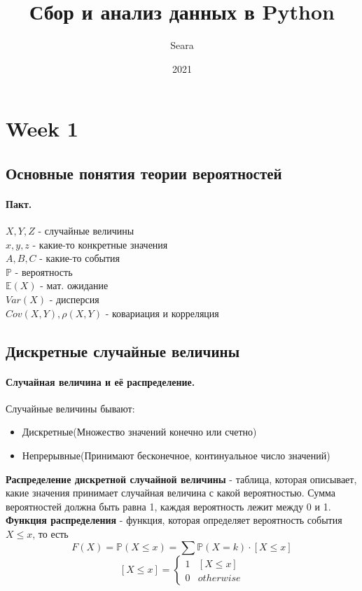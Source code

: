 \documentclass{article}
\title{Сбор и анализ данных в Python}
\date{2021}
\author{Seara}
\newcommand{\E}{\mathbb{E}}
\begin{document}
\maketitle
\newpage
{}

\section{Week 1}
\subsection{Основные понятия теории вероятностей}
\paragraph{Пакт.}
$X,Y,Z$ - случайные величины
\\
$x,y,z$ - какие-то конкретные значения
\\
$A,B,C$ - какие-то события
\\
$\mathbb{P}$ - вероятность
\\
$\E(X)$ - мат. ожидание
\\
$Var(X)$ - дисперсия
\\
$Cov(X,Y), \rho(X,Y)$ - ковариация и корреляция
\subsection{Дискретные случайные величины}
\paragraph{Случайная величина и её распределение.}
Случайные величины бывают:
\begin{itemize}
	\item Дискретные(Множество значений конечно или счетно)
	\item Непрерывные(Принимают бесконечное, континуальное число значений)
\end{itemize}
{\bf Распределение дискретной случайной величины} - таблица, которая описывает, какие значения принимает случайная величина с какой вероятностью. Сумма вероятностей должна быть равна 1, каждая вероятность лежит между 0 и 1.
\\
{\bf Функция распределения} - функция, которая определяет вероятность события $X \leq x$, то есть
\[
F(X) = \mathbb{P}(X \leq x) = \sum \mathbb{P}(X=k)\cdot [X \leq x]
\]
\[
[X \leq x] = 
  \begin{cases}
     1 & [X \leq x] \\
     0 & otherwise
  \end{cases}
\]
\end{document}
